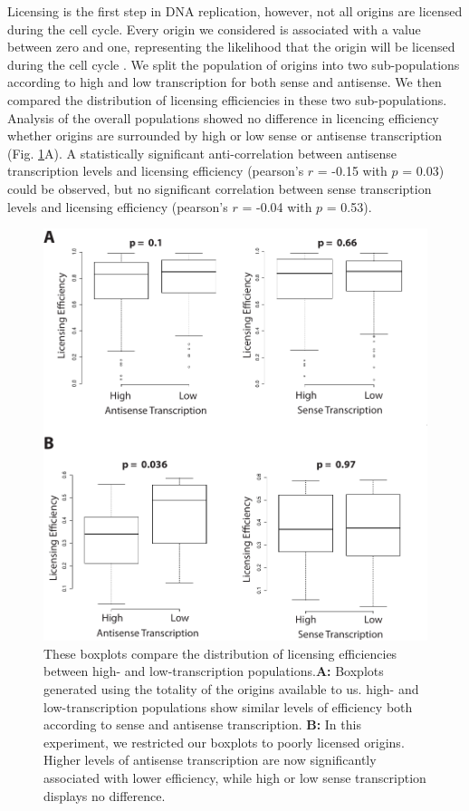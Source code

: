 Licensing is the first step in DNA replication, however, not all origins are licensed during the cell cycle.
Every origin we considered is associated with a value between zero and one, representing the likelihood that the origin will be licensed during the cell cycle \cite{hawkins:2013:highresolution}. 
We split the population of origins into two sub-populations according to high and low transcription for both sense and antisense. 
We then compared the distribution of licensing efficiencies in these two sub-populations. 
Analysis of the overall populations showed no difference in licencing efficiency whether origins are surrounded by high or low sense or antisense transcription (Fig. \ref{fig:licensing}A). 
A statistically significant anti-correlation between antisense transcription levels and licensing efficiency (pearson’s $r$ = -0.15 with $p$ = 0.03) could be observed, but no significant correlation between sense transcription levels and licensing efficiency (pearson’s $r$ = -0.04 with $p$ = 0.53). 
\begin{figure}[hp!]

\centering
\includegraphics[width=\textwidth]{figures/results/competence}
\caption[Boxplots comparing licensing efficiencies in high- and low-transcription populations]{These boxplots compare the distribution of licensing efficiencies between high- and low-transcription populations.\textbf{A: }Boxplots generated using the totality of the origins available to us. high- and low-transcription populations show similar levels of efficiency both according to sense and antisense transcription. \textbf{B: } In this experiment, we restricted our boxplots to poorly licensed origins. Higher levels of antisense transcription are now significantly associated with lower efficiency, while high or low sense transcription displays no difference. }
\label{fig:licensing}

\end{figure} 
